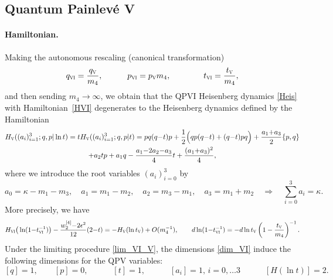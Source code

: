 \documentclass[12pt,a4paper]{article}
\numberwithin{equation}{section}
\newcommand{\VI}{\scalebox{.6}{VI}}
\newcommand{\V}{\scalebox{.6}{V}}
\begin{document}
\subsection{Quantum Painlev\'e V}
\label{ssec:QPV}
\paragraph{Hamiltonian.}
Making the autonomous rescaling (canonical transformation)
\begin{equation}\label{lim_VI_V}
 q_{\VI}=\frac{q_{\V}}{m_4}, \qquad \quad p_{\VI}=p_{\V}m_4, \qquad \qquad t_{\VI}=\frac{t_{\V}}{m_4},
 \end{equation}
 and then sending $m_4\rightarrow\infty$, we obtain that the QPVI Heisenberg dynamics \eqref{Heis} with Hamiltonian~\eqref{HVI} degenerates to the Heisenberg dynamics defined by the Hamiltonian
\begin{multline}\label{HV}
 H_{\V}((a_i)_{i=1}^3;q,p|\ln t)=t H_{\V}((a_i)_{i=1}^3;q,p|t)=pq(q{-}t)p+\frac12\Big(qp(q{-}t)+(q{-}t)pq\Big)+\frac{a_1{+}a_3}2\{p,q\}\\+a_2tp+a_1q-\frac{a_1{-}2a_2{-}a_3}4t+\frac{(a_1{+}a_3)^2}4,
 \end{multline}
 where we introduce the root variables $(a_i)_{i=0}^3$ by
\begin{equation}
a_0=\kappa{-}m_1{-}m_3, \quad a_1=m_1{-}m_2, \quad a_2=m_3{-}m_1, \quad a_3=m_1{+}m_2 \quad \Rightarrow \quad \sum_{i=0}^3a_i=\kappa.  
\end{equation}
More precisely, we have
\begin{equation}
H_{\VI}\big(\ln(1{-}t_{\VI}^{-1})\big)-\frac{w_2^{[4]}{-}2\epsilon^2}{12}(2{-}t)=-H_{\V}(\ln t_{\V})+O(m_4^{-1}), \qquad  d\ln(1{-}t^{-1}_{\VI})=-d\ln t_{\V}\left(1-\frac{t_{\V}}{m_4}\right)^{-1}.
\end{equation}
Under the limiting procedure \eqref{lim_VI_V}, the dimensions \eqref{dim_VI} induce the following dimensions for the QPV variables:
\begin{equation}\label{dim_V}
[q]=1, \qquad [p]=0, \qquad \quad [t]=1, \qquad \quad  [a_i]=1,\, {\scriptstyle i=0,\ldots3} \qquad \quad [H(\ln t)]=2.
\end{equation}
\end{document}
